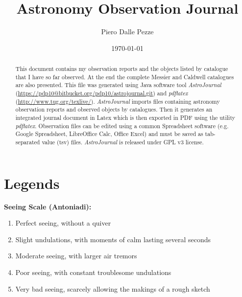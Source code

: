 \documentclass[10pt,twoside,a4paper,english]{article}
\title{Astronomy Observation Journal}
\author{Piero Dalle Pezze}
\date{\today}
\begin{document}
 
 
\maketitle 
 
\begin{abstract} 
This document contains my observation reports and the objects listed by catalogue that I have so far observed. At the end the complete Messier and Caldwell catalogues are also presented. This file was generated using Java software tool {\it AstroJournal} (\href{https://pdp10@bitbucket.org/pdp10/astrojournal.git}{https://pdp10@bitbucket.org/pdp10/astrojournal.git}) and {\it pdflatex} (\href{http://www.tug.org/texlive/}{http://www.tug.org/texlive/}). {\it AstroJournal} imports files containing astronomy observation reports and observed objects by catalogues. Then it generates an integrated journal document in Latex which is then exported in PDF using the utility {\it pdflatex}. Observation files can be edited using a common Spreadsheet software (e.g. Google Spreadsheet, LibreOffice Calc, Office Excel) and must be saved as tab-separated value (tsv) files. {\it AstroJournal} is released under GPL v3 license. 
\end{abstract} 
 
\tableofcontents 
 
\newpage 
 
 
\small 
 
 
\section{Legends} 
 
\noindent  
 
\bigskip  
{\bf Seeing Scale (Antoniadi):} 
\begin{enumerate} 
\item Perfect seeing, without a quiver 
\item Slight undulations, with moments of calm lasting several seconds 
\item Moderate seeing, with larger air tremors 
\item Poor seeing, with constant troublesome undulations 
\item Very bad seeing, scarcely allowing the makings of a rough sketch 
\end{enumerate} 
 
\end{document}
